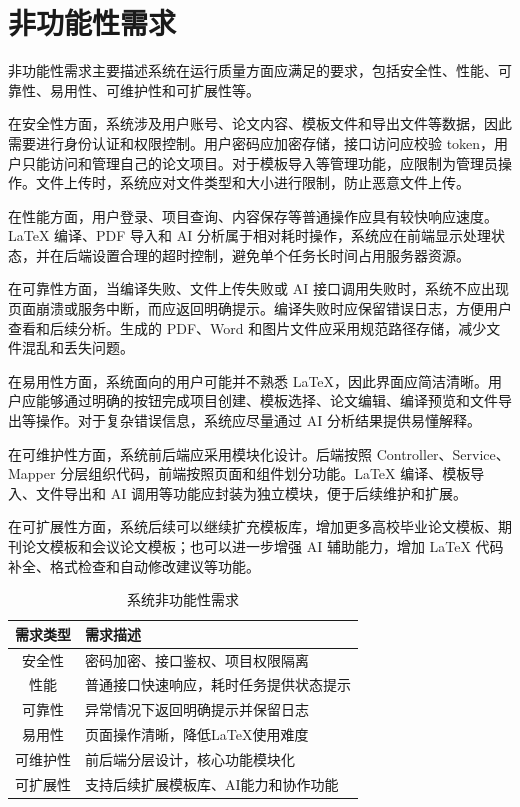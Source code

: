 \documentclass{xduugthesis}
\begin{document}
\section{非功能性需求}
非功能性需求主要描述系统在运行质量方面应满足的要求，包括安全性、性能、可靠性、易用性、可维护性和可扩展性等。

在安全性方面，系统涉及用户账号、论文内容、模板文件和导出文件等数据，因此需要进行身份认证和权限控制。用户密码应加密存储，接口访问应校验 token，用户只能访问和管理自己的论文项目。对于模板导入等管理功能，应限制为管理员操作。文件上传时，系统应对文件类型和大小进行限制，防止恶意文件上传。

在性能方面，用户登录、项目查询、内容保存等普通操作应具有较快响应速度。LaTeX 编译、PDF 导入和 AI 分析属于相对耗时操作，系统应在前端显示处理状态，并在后端设置合理的超时控制，避免单个任务长时间占用服务器资源。

在可靠性方面，当编译失败、文件上传失败或 AI 接口调用失败时，系统不应出现页面崩溃或服务中断，而应返回明确提示。编译失败时应保留错误日志，方便用户查看和后续分析。生成的 PDF、Word 和图片文件应采用规范路径存储，减少文件混乱和丢失问题。

在易用性方面，系统面向的用户可能并不熟悉 LaTeX，因此界面应简洁清晰。用户应能够通过明确的按钮完成项目创建、模板选择、论文编辑、编译预览和文件导出等操作。对于复杂错误信息，系统应尽量通过 AI 分析结果提供易懂解释。

在可维护性方面，系统前后端应采用模块化设计。后端按照 Controller、Service、Mapper 分层组织代码，前端按照页面和组件划分功能。LaTeX 编译、模板导入、文件导出和 AI 调用等功能应封装为独立模块，便于后续维护和扩展。

在可扩展性方面，系统后续可以继续扩充模板库，增加更多高校毕业论文模板、期刊论文模板和会议论文模板；也可以进一步增强 AI 辅助能力，增加 LaTeX 代码补全、格式检查和自动修改建议等功能。

\begin{table}[!ht]
    \centering
    \caption{系统非功能性需求}
    \label{tab:non-functional-requirement}
    \begin{tabular}{|c|p{9cm}|}
        \hline
        需求类型 & 需求描述 \\
        \hline
        安全性 & 密码加密、接口鉴权、项目权限隔离 \\
        \hline
        性能 & 普通接口快速响应，耗时任务提供状态提示 \\
        \hline
        可靠性 & 异常情况下返回明确提示并保留日志 \\
        \hline
        易用性 & 页面操作清晰，降低LaTeX使用难度 \\
        \hline
        可维护性 & 前后端分层设计，核心功能模块化 \\
        \hline
        可扩展性 & 支持后续扩展模板库、AI能力和协作功能 \\
        \hline
    \end{tabular}
\end{table}
\end{document}
